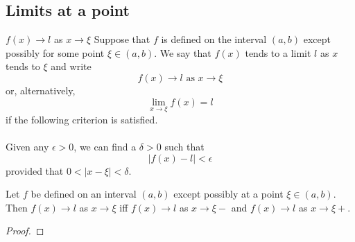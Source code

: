 \documentclass[10pt, a4paper]{article}
\begin{document}
\subsection{Limits at a point}
$f(x) \rightarrow l$ as $x \rightarrow \xi$ Suppose that $f$ is defined on the interval $(a, b)$ except possibly for some point $\xi \in (a, b)$. We say that $f(x)$ tends to a limit $l$ as $x$ tends to $\xi$ and write
\[f(x) \rightarrow l \text{ as } x \rightarrow \xi\]
or, alternatively,
\[\lim_{x \rightarrow \xi}{f(x)} = l\]
if the following criterion is satisfied. \\
\\
Given any $\epsilon > 0$, we can find a $\delta > 0$ such that
\[|f(x) - l| < \epsilon\]
provided that $0 < |x - \xi| < \delta$.

\begin{proposition}
    Let $f$ be defined on an interval $(a, b)$ except possibly at a point $\xi \in (a, b)$. Then $f(x) \rightarrow l$ as $x \rightarrow \xi$ iff $f(x) \rightarrow l$ as $x \rightarrow \xi-$ and $f(x) \rightarrow l$ as $x \rightarrow \xi+$.
\end{proposition}
\begin{proof}
\end{proof}
\end{document}
